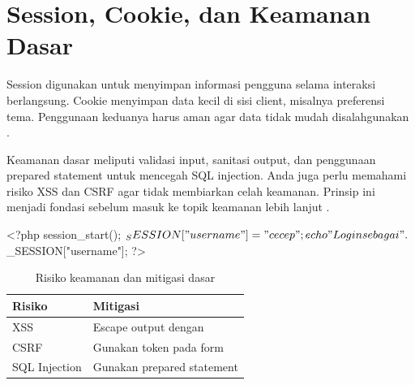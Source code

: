 \section{Session, Cookie, dan Keamanan Dasar}
Session digunakan untuk menyimpan informasi pengguna selama interaksi berlangsung. Cookie menyimpan data kecil di sisi client, misalnya preferensi tema. Penggunaan keduanya harus aman agar data tidak mudah disalahgunakan \cite{phpRightWay}.

Keamanan dasar meliputi validasi input, sanitasi output, dan penggunaan prepared statement untuk mencegah SQL injection. Anda juga perlu memahami risiko XSS dan CSRF agar tidak membiarkan celah keamanan. Prinsip ini menjadi fondasi sebelum masuk ke topik keamanan lebih lanjut \cite{owaspXss}.

\begin{webcode}[language=PHP, caption={Session Dasar di PHP}]
<?php
session_start();
$_SESSION["username"] = "cecep";
echo "Login sebagai " . $_SESSION["username"];
?>
\end{webcode}

\begin{table}[ht]
\centering
\begin{tabular}{|P{4cm}|P{7cm}|}
\hline
\textbf{Risiko} & \textbf{Mitigasi} \\
\hline
XSS & Escape output dengan  \\
\hline
CSRF & Gunakan token pada form \cite{owaspCsrf} \\
\hline
SQL Injection & Gunakan prepared statement \\
\hline
\end{tabular}
\caption{Risiko keamanan dan mitigasi dasar}
\end{table}

